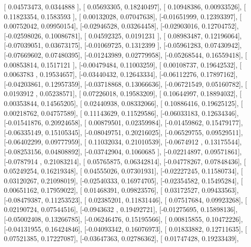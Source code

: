 \documentclass{article}
\begin{document}
       [ 0.04573473,  0.0344888 ],
       [ 0.05693305,  0.18240497],
       [ 0.10948386,  0.00933526],
       [ 0.11823354,  0.1583593 ],
       [ 0.00132028,  0.07047638],
       [-0.01651999,  0.12393397],
       [ 0.00752042,  0.09950154],
       [-0.02946528,  0.03264458],
       [-0.02903016,  0.12704752],
       [-0.02598026,  0.10086781],
       [ 0.04592325,  0.0191231 ],
       [ 0.08983487,  0.12196064],
       [-0.07039051,  0.03673175],
       [-0.01069725,  0.1312399 ],
       [-0.05961283,  0.07430942],
       [-0.07669602,  0.07480395],
       [-0.01243989,  0.02779958],
       [-0.05268544,  0.16559418],
       [ 0.00853814,  0.1517121 ],
       [-0.00479484,  0.11003259],
       [ 0.00108737,  0.19642532],
       [ 0.0063783 ,  0.19534657],
       [-0.03440432,  0.12643334],
       [-0.06112276,  0.17897162],
       [-0.04203861,  0.12957359],
       [-0.03718868,  0.13066636],
       [-0.06721549,  0.05160782],
       [ 0.0193912 ,  0.05238571],
       [ 0.07226018,  0.19583209],
       [ 0.10644997,  0.18894032],
       [ 0.00353844,  0.14565205],
       [ 0.02440938,  0.08332066],
       [ 0.10886416,  0.19625125],
       [ 0.00218762,  0.04757589],
       [ 0.11143629,  0.11529586],
       [-0.06033183,  0.12634346],
       [-0.01541876,  0.20924658],
       [ 0.00879501,  0.02359984],
       [-0.01459862,  0.15479177],
       [-0.06335149,  0.15105345],
       [-0.08049751,  0.20216025],
       [-0.06529755,  0.09529511],
       [-0.06402299,  0.09777959],
       [ 0.11032034,  0.21010539],
       [-0.0674912 ,  0.13175544],
       [-0.08253156,  0.04808892],
       [-0.03742904,  0.1060685 ],
       [-0.02214897,  0.09571861],
       [-0.0787914 ,  0.21083214],
       [ 0.05765875,  0.06342814],
       [-0.04778267,  0.07848436],
       [ 0.05249254,  0.16219348],
       [ 0.04555026,  0.07301931],
       [-0.02227245,  0.11580734],
       [ 0.03120267,  0.21098019],
       [-0.02540333,  0.16974705],
       [-0.02354582,  0.15495284],
       [ 0.00651162,  0.17959022],
       [ 0.01468391,  0.09823576],
       [ 0.03172527,  0.09433563],
       [-0.08479387,  0.11253523],
       [ 0.02385201,  0.11831446],
       [ 0.07517684,  0.09923268],
       [ 0.02190724,  0.07544516],
       [-0.0943632 ,  0.19492721],
       [-0.01275695,  0.15898136],
       [-0.05002408,  0.13266785],
       [-0.06246476,  0.15195566],
       [ 0.00815855,  0.10472226],
       [-0.04131955,  0.16424846],
       [-0.04093342,  0.16076973],
       [ 0.01833882,  0.12711635],
       [ 0.07521385,  0.17227087],
       [-0.03647363,  0.02786362],
       [ 0.01747428,  0.19233439],
\end{document}
